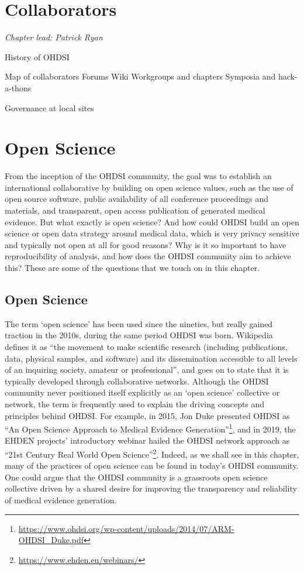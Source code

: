 \documentclass[11pt]{book}
\let\rmarkdownfootnote\footnote%
\def\footnote{\protect\rmarkdownfootnote}
\begin{document}
\chapter{Collaborators}\label{Collaborators}

\emph{Chapter lead: Patrick Ryan}

History of OHDSI

Map of collaborators Forums Wiki Workgroups and chapters Symposia and
hack-a-thons

Governance at local sites

\chapter{Open Science}\label{OpenScience}

From the inception of the OHDSI community, the goal was to establish an
international collaborative by building on open science values, such as
the use of open source software, public availability of all conference
proceedings and materials, and transparent, open access publication of
generated medical evidence. But what exactly is open science? And how
could OHDSI build an open science or open data strategy around medical
data, which is very privacy sensitive and typically not open at all for
good reasons? Why is it so important to have reproducibility of
analysis, and how does the OHDSI community aim to achieve this? These
are some of the questions that we touch on in this chapter.

\section{Open Science}\label{open-science}

The term `open science' has been used since the nineties, but really
gained traction in the 2010s, during the same period OHDSI was born.
Wikipedia \citep{wiki:Open_science} defines it as ``the movement to make
scientific research (including publications, data, physical samples, and
software) and its dissemination accessible to all levels of an inquiring
society, amateur or professional'', and goes on to state that it is
typically developed through collaborative networks. Although the OHDSI
community never positioned itself explicitly as an `open science'
collective or network, the term is frequently used to explain the
driving concepts and principles behind OHDSI. For example, in 2015, Jon
Duke presented OHDSI as ``An Open Science Approach to Medical Evidence
Generation''\footnote{\url{https://www.ohdsi.org/wp-content/uploads/2014/07/ARM-OHDSI_Duke.pdf}},
and in 2019, the EHDEN projects' introductory webinar hailed the OHDSI
network approach as ``21st Century Real World Open Science''\footnote{\url{https://www.ehden.eu/webinars/}}.
Indeed, as we shall see in this chapter, many of the practices of open
science can be found in today's OHDSI community. One could argue that
the OHDSI community is a grassroots open science collective driven by a
shared desire for improving the transparency and reliability of medical
evidence generation.
\end{document}
